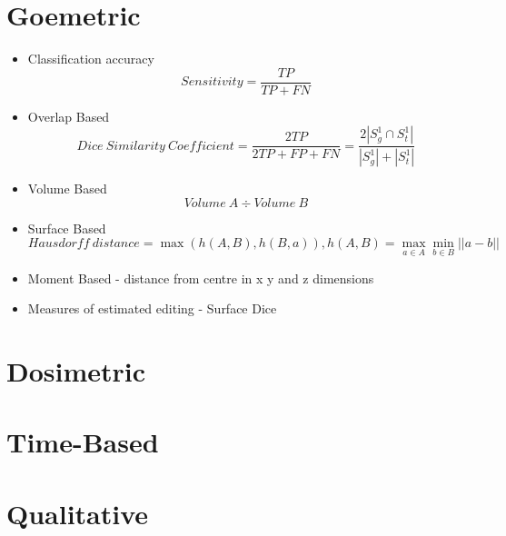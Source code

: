 \documentclass[11pt]{article}
\begin{document}


\tableofcontents

\clearpage

\section{Goemetric}

\begin{itemize}
    \item Classification accuracy \begin{equation*}
        Sensitivity = \frac{TP}{TP+FN}
    \end{equation*}
    \item Overlap Based~\cite{3d-medical-metric-analysis-2015}
    \begin{equation*}
        Dice\ Similarity\ Coefficient = \frac{2TP}{2TP+FP+FN} = \frac{2|S_g^1 \cap S_t^1|}{|S_g^1| + |S^1_t|}
    \end{equation*}
    \item Volume Based \begin{equation*}
        Volume\ A \div Volume\ B
    \end{equation*}
    \item Surface Based \begin{equation*}
        Hausdorff\ distance = \max(h(A,B), h(B,a)), h(A,B) = \max_{a \in A} \min_{b \in B} || a - b ||
    \end{equation*}
    \item Moment Based - distance from centre in x y and z dimensions
    \item Measures of estimated editing - Surface Dice
\end{itemize}

\section{Dosimetric}



\section{Time-Based}

\section{Qualitative}

\printbibliography
\end{document}
